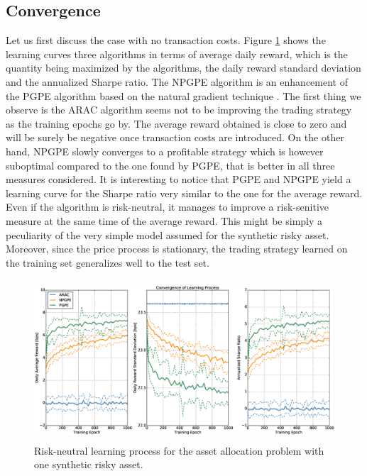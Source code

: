 \subsection{Convergence}
Let us first discuss the case with no transaction costs. Figure \ref{fig:single_synthetic_neutral_convergence} shows the learning curves three algorithms in terms of average daily reward, which is the quantity being maximized by the algorithms, the daily reward standard deviation and the annualized Sharpe ratio. 
The NPGPE algorithm is an enhancement of the PGPE algorithm based on the natural gradient technique \cite{miyamae2010natural}. The first thing we observe is the ARAC algorithm seems not to be improving the trading strategy as the training epochs go by. The average reward obtained is close to zero and will be surely be negative once transaction costs are introduced. On the other hand, NPGPE slowly converges to a profitable strategy which is however suboptimal compared to the one found by PGPE, that is better in all three measures considered. It is interesting to notice that PGPE and NPGPE yield a learning curve for the Sharpe ratio very similar to the one for the average reward. Even if the algorithm is risk-neutral, it manages to improve a risk-senitive measure at the same time of the average reward. This might be simply a peculiarity of the very simple model assumed for the synthetic risky asset. Moreover, since the price process is stationary, the trading strategy learned on the training set generalizes well to the test set. 
\begin{figure}[t!]
	\centering
	\includegraphics[height=6cm,width=1.0\textwidth]{Images/6_0_single_synthetic_neutral_convergence}
	\caption[Risk-neutral learning process for one synthetic risky asset]{Risk-neutral learning process for the asset allocation problem with one synthetic risky asset.}
	\label{fig:single_synthetic_neutral_convergence}
\end{figure}


